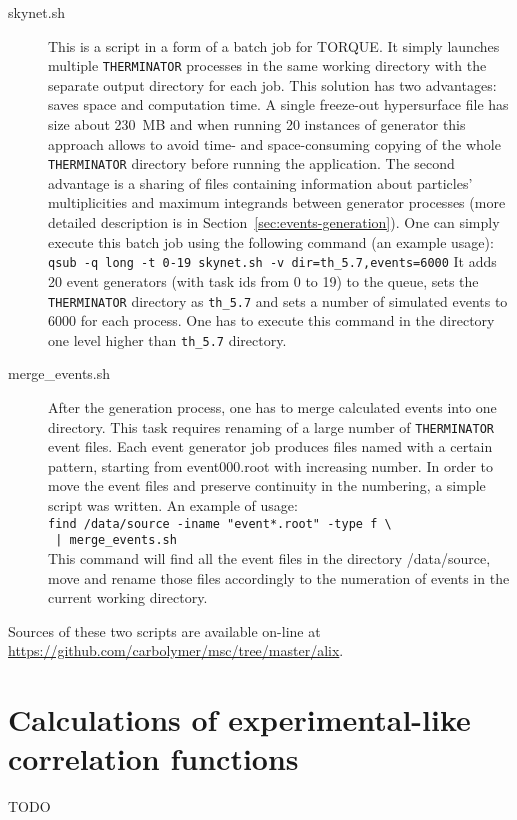    \begin{description}
      \item[skynet.sh] This is a script in a form of a batch job for TORQUE.
        It simply launches multiple \verb|THERMINATOR| processes in the same working directory with the separate output directory for each job.
        This solution has two advantages: saves space and computation time.
        A single freeze-out hypersurface file has size about 230~MB and when running 20 instances of generator this approach allows to avoid time- and space-consuming copying of the whole \verb|THERMINATOR| directory before running the application.
        The second advantage is a sharing of files containing information about particles' multiplicities and maximum integrands between generator processes (more detailed description is in Section~\ref{sec:events-generation}).
        One can simply execute this batch job using the following command (an example usage):
        \\\verb|qsub -q long -t 0-19 skynet.sh -v dir=th_5.7,events=6000|
        It adds 20 event generators (with task ids from 0 to 19) to the queue, sets the \verb|THERMINATOR| directory as \verb|th_5.7| and sets a number of simulated events to 6000 for each process.
        One has to execute this command in the directory one level higher than \verb|th_5.7| directory.
      \item[merge\_events.sh] After the generation process, one has to merge calculated events into one directory.
        This task requires renaming of a large number of \verb|THERMINATOR| event files.
        Each event generator job produces files named with a certain pattern, starting from event000.root with increasing number.
        In order to move the event files and preserve continuity in the numbering, a simple script was written.
        An example of usage:
        \\\verb&find /data/source -iname "event*.root" -type f \ &
        \\\verb& | merge_events.sh&\\
        This command will find all the event files in the directory /data/source, move and rename those files accordingly to the numeration of events in the current working directory.
    \end{description}
    Sources of these two scripts are available on-line at \url{https://github.com/carbolymer/msc/tree/master/alix}.
  \section{Calculations of experimental-like correlation functions}
    TODO